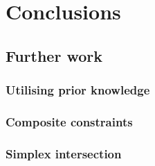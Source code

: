 \documentclass[../main.tex]{subfiles}
\begin{document}
\chapter{Conclusions}

\section{Further work}
\subsection{Utilising prior knowledge}
\subsection{Composite constraints}
\subsection{Simplex intersection}
\end{document}
